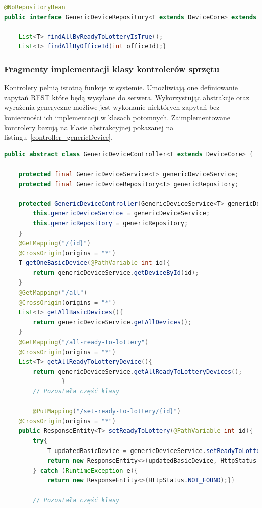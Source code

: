\begin{lstlisting}[language=Java, style=JavaStyle,  caption={Generyczne repozytorium sprzętu komputerowego:  GenericDeviceRepository}, label={repo_genericDevice}]
@NoRepositoryBean
public interface GenericDeviceRepository<T extends DeviceCore> extends JpaRepository<T, Integer> {
    
    List<T> findAllByReadyToLotteryIsTrue();
    List<T> findAllByOfficeId(int officeId);}
\end{lstlisting}



\subsubsection{Fragmenty implementacji klasy kontrolerów sprzętu}
Kontrolery pełnią istotną funkcje w systemie. Umożliwiają one definiowanie zapytań REST które będą wysyłane do serwera. Wykorzystując abstrakcje oraz wyrażenia generyczne możliwe jest wykonanie niektórych zapytań bez konieczności ich implementacji w klasach potomnych. Zaimplementowane kontrolery bazują na klasie abstrakcyjnej pokazanej na listingu~\ref{controller_genericDevice}.

\begin{lstlisting}[language=Java, style=JavaStyle,  caption={Klasa nadrzędna kontrolera sprzętu: \texttt{GenericDeviceController}}, label={controller_genericDevice}]
public abstract class GenericDeviceController<T extends DeviceCore> {

    protected final GenericDeviceService<T> genericDeviceService;
    protected final GenericDeviceRepository<T> genericRepository;

    protected GenericDeviceController(GenericDeviceService<T> genericDeviceService, GenericDeviceRepository<T> genericRepository) {
        this.genericDeviceService = genericDeviceService;
        this.genericRepository = genericRepository;
    }
    @GetMapping("/{id}")
    @CrossOrigin(origins = "*")
    T getOneBasicDevice(@PathVariable int id){
        return genericDeviceService.getDeviceById(id);
    }
    @GetMapping("/all")
    @CrossOrigin(origins = "*")
    List<T> getAllBasicDevices(){
        return genericDeviceService.getAllDevices();
    }
    @GetMapping("/all-ready-to-lottery")
    @CrossOrigin(origins = "*")
    List<T> getAllReadyToLotteryDevice(){
        return genericDeviceService.getAllReadyToLotteryDevices();
				}
		// Pozostała część klasy
		
		@PutMapping("/set-ready-to-lottery/{id}")
    @CrossOrigin(origins = "*")
    public ResponseEntity<T> setReadyToLottery(@PathVariable int id){
        try{
            T updatedBasicDevice = genericDeviceService.setReadyToLottery(id);
            return new ResponseEntity<>(updatedBasicDevice, HttpStatus.OK);
        } catch (RuntimeException e){
            return new ResponseEntity<>(HttpStatus.NOT_FOUND);}}
		
		// Pozostała część klasy
\end{lstlisting}


